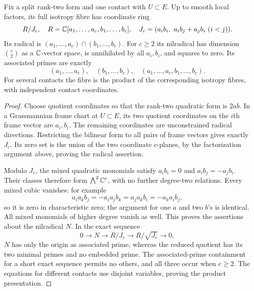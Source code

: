\begin{proposition}
\label{prop:rank-two-fibre}
Fix a split rank-two form and one contact with $U\subset E$.
Up to smooth local factors, its full isotropy fibre has coordinate ring
\begin{equation}\label{eq:rank-two-fibre-ring}
 R/J_c,\quad R=\mathbb C[a_1,\ldots,a_c,b_1,\ldots,b_c],\quad
 J_c=(a_i b_i,\ a_i b_j+a_j b_i\ (i<j)).
\end{equation}
Its radical is $(a_1,\ldots,a_c)\cap(b_1,\ldots,b_c)$.
For $c\ge2$ its nilradical has dimension $\binom c2$ as a
$\mathbb C$-vector space, is annihilated by all $a_i,b_i$, and squares to
zero. Its associated primes are exactly
\[
 (a_1,\ldots,a_c),\quad (b_1,\ldots,b_c),\quad
 (a_1,\ldots,a_c,b_1,\ldots,b_c).
\]
For several contacts the fibre is the product of the corresponding
isotropy fibres, with independent contact coordinates.
\end{proposition}
\begin{proof}
Choose quotient coordinates so that the rank-two quadratic form is
$2ab$. In a Grassmannian frame chart at $U\subset E$, its two quotient
coordinates on the $i$th frame vector are $a_i,b_i$. The remaining
coordinates are unconstrained radical directions. Restricting the
bilinear form to all pairs of frame vectors gives exactly $J_c$.
Its zero set is the union of the two coordinate $c$-planes, by the
factorization argument above, proving the radical assertion.

Modulo $J_c$, the mixed quadratic monomials satisfy
$a_i b_i=0$ and $a_i b_j=-a_j b_i$. Their classes therefore form
$\bigwedge^2\mathbb C^c$, with no further degree-two relations. Every mixed
cubic vanishes: for example
\[
 a_i a_k b_j=-a_i a_j b_k=a_j a_k b_i=-a_k a_i b_j,
\]
so it is zero in characteristic zero; the argument for one $a$ and two
$b$'s is identical. All mixed monomials of higher degree vanish as
well. This proves the assertions about the nilradical $N$.
In the exact sequence
\[
 0\longrightarrow N\longrightarrow R/J_c
 \longrightarrow R/\sqrt{J_c}\longrightarrow0,
\]
$N$ has only the origin as associated prime, whereas the reduced
quotient has its two minimal primes and no embedded prime.
The associated-prime containment for a short exact sequence permits
no others, and all three occur when $c\ge2$. The equations for
different contacts use disjoint variables, proving the product
presentation.
\end{proof}
